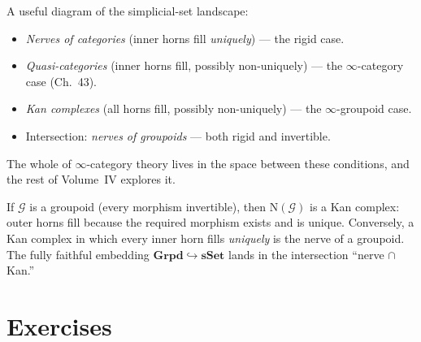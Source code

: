 \begin{readernote}
A useful diagram of the simplicial-set landscape:
\begin{itemize}
  \item \emph{Nerves of categories} (inner horns fill \emph{uniquely}) —
        the rigid case.
  \item \emph{Quasi-categories} (inner horns fill, possibly non-uniquely) —
        the $\infty$-category case (Ch.~43).
  \item \emph{Kan complexes} (all horns fill, possibly non-uniquely) —
        the $\infty$-groupoid case.
  \item Intersection: \emph{nerves of groupoids} — both rigid and
        invertible.
\end{itemize}
The whole of $\infty$-category theory lives in the space between these
conditions, and the rest of Volume~IV explores it.
\end{readernote}

\begin{example_thm}
\label{ex:nerve-groupoid}
If $\mathcal{G}$ is a groupoid (every morphism invertible), then
$\mathrm{N}(\mathcal{G})$ is a Kan complex: outer horns fill because the
required morphism exists and is unique. Conversely, a Kan complex in
which every inner horn fills \emph{uniquely} is the nerve of a groupoid.
The fully faithful embedding $\mathbf{Grpd} \hookrightarrow \mathbf{sSet}$
lands in the intersection ``nerve $\cap$ Kan.''
\end{example_thm}


\section{Exercises}
\label{sec:realization-nerve-exercises}

